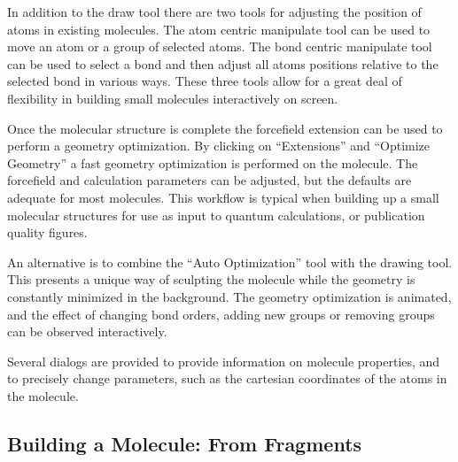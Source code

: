 \documentclass[10pt]{bmc_article}
\newenvironment{bmcformat}{\begin{raggedright}
\baselineskip20pt\sloppy\setboolean{publ}{false}}{\end{raggedright}
\baselineskip20pt\sloppy}
\begin{document}
\begin{bmcformat}
In addition to the draw tool there are two tools for adjusting the position of
atoms in existing molecules. The atom centric manipulate tool can be used to
move an atom or a group of selected atoms. The bond centric manipulate tool can
be used to select a bond and then adjust all atoms positions relative to the
selected bond in various ways. These three tools allow for a great deal of
flexibility in building small molecules interactively on screen.

Once the molecular structure is complete the forcefield extension can be used to
perform a geometry optimization. By clicking on ``Extensions'' and ``Optimize
Geometry'' a fast geometry optimization is performed on the molecule. The
forcefield and calculation parameters can be adjusted, but the defaults are
adequate for most molecules. This workflow is typical when building up a small
molecular structures for use as input to quantum calculations, or publication
quality figures.

An alternative is to combine the ``Auto Optimization'' tool with the drawing
tool. This presents a unique way of sculpting the molecule while the geometry is
constantly minimized in the background. The geometry optimization is animated,
and the effect of changing bond orders, adding new groups or removing groups can
be observed interactively.

Several dialogs are provided to provide information on molecule properties, and
to precisely change parameters, such as the cartesian coordinates of the atoms
in the molecule.

\subsection{Building a Molecule: From Fragments} %


\end{bmcformat}
\end{document}
